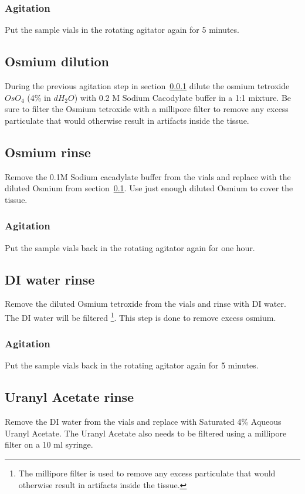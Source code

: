 \subsubsection{Agitation}\label{agitation 5 number 2}
Put the sample vials in the rotating agitator again for 5 minutes. 

\subsection{Osmium dilution}\label{osmium dilution}
During the previous agitation step in section~\ref{agitation 5 number 2} dilute
the osmium tetroxide $OsO_4$ (4\% in $dH_2O$) with 0.2 M Sodium Cacodylate
buffer in a 1:1 mixture.  Be sure to filter the Osmium tetroxide with a
millipore filter to remove any excess particulate that would otherwise result
in artifacts inside the tissue.  

\subsection{Osmium rinse}\label{osmium rinse}
Remove the 0.1M Sodium cacadylate buffer from the vials and replace with the
diluted Osmium from section~\ref{osmium dilution}.  Use just enough diluted
Osmium to cover the tissue.

\subsubsection{Agitation}\label{agitation hr}
Put the sample vials back in the rotating agitator again for one hour. 

\subsection{DI water rinse}\label{DI water rinse}
Remove the diluted Osmium tetroxide from the vials and rinse with DI water.
The DI water will be filtered \footnote{\label{note1}The millipore filter is
used to remove any excess particulate that would otherwise result in artifacts
inside the tissue.}.  This step is done to remove excess osmium.

\subsubsection{Agitation}\label{agitation 5 number 3}
Put the sample vials back in the rotating agitator again for 5 minutes. 

\subsection{Uranyl Acetate rinse}\label{Uranyl Acetate rinse}
Remove the DI water from the vials and replace with Saturated 4\% Aqueous
Uranyl Acetate.  The Uranyl Acetate also needs to be filtered using a millipore
filter on a 10 ml syringe.  

